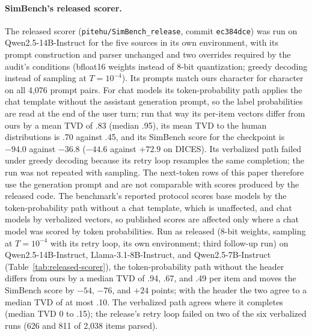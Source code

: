 \documentclass[11pt]{article}
\begin{document}
\paragraph{SimBench's released scorer.}
The released scorer (\texttt{pitehu/SimBench\_release}, commit
\texttt{ec384dce}) was run on Qwen2.5-14B-Instruct for the five sources in
its own environment, with its prompt construction and parser unchanged and
two overrides required by the audit's conditions (bfloat16 weights instead
of 8-bit quantization; greedy decoding instead of sampling at
$T{=}10^{-4}$). Its prompts match ours character for character on all 4,076
prompt pairs. For chat models its token-probability path applies the chat
template without the assistant generation prompt, so the label probabilities
are read at the end of the user turn; run that way its per-item vectors
differ from ours by a mean TVD of .83 (median .95), its mean TVD to the
human distributions is .70 against .45, and its SimBench score for the
checkpoint is $-94.0$ against $-36.8$ ($-44.6$ against $+72.9$ on DICES).
Its verbalized path failed under greedy decoding because its retry loop
resamples the same completion; the run was not repeated with sampling. The next-token rows of this paper therefore use the generation prompt and are not comparable with scores produced by the released code. The benchmark's reported protocol scores base models by the token-probability path without a chat template, which is unaffected, and chat models by verbalized vectors, so published scores are affected only where a chat model was scored by token probabilities. Run as released (8-bit weights, sampling at $T{=}10^{-4}$ with its retry loop, its own environment; third follow-up run) on Qwen2.5-14B-Instruct, Llama-3.1-8B-Instruct, and Qwen2.5-7B-Instruct (Table~\ref{tab:released-scorer}), the token-probability path without the header differs from ours by a median TVD of .94, .67, and .49 per item and moves the SimBench score by $-54$, $-76$, and $+24$ points; with the header the two agree to a median TVD of at most .10. The verbalized path agrees where it completes (median TVD 0 to .15); the release's retry loop failed on two of the six verbalized runs (626 and 811 of 2,038 items parsed).
\end{document}
